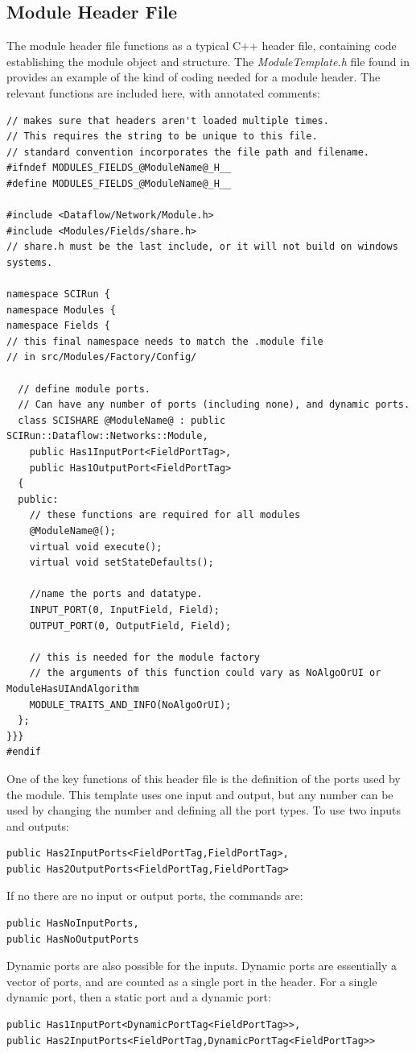 \documentclass[fleqn,11pt,openany]{book}
\begin{document}
\subsection{Module Header File}
\label{sec:header}

The module header file functions as a typical C++ header file, containing code establishing the module object and structure.  
The \emph{ModuleTemplate.h} file found in \emph{} provides an example of the kind of coding needed for a module header.  
The relevant functions are included here, with annotated comments:
\begin{verbatim}
// makes sure that headers aren't loaded multiple times. 
// This requires the string to be unique to this file.
// standard convention incorporates the file path and filename.
#ifndef MODULES_FIELDS_@ModuleName@_H__
#define MODULES_FIELDS_@ModuleName@_H__

#include <Dataflow/Network/Module.h>
#include <Modules/Fields/share.h>
// share.h must be the last include, or it will not build on windows systems.

namespace SCIRun {
namespace Modules {
namespace Fields {
// this final namespace needs to match the .module file
// in src/Modules/Factory/Config/
  
  // define module ports.  
  // Can have any number of ports (including none), and dynamic ports.
  class SCISHARE @ModuleName@ : public SCIRun::Dataflow::Networks::Module,
    public Has1InputPort<FieldPortTag>,
    public Has1OutputPort<FieldPortTag>
  {
  public:
    // these functions are required for all modules
    @ModuleName@();
    virtual void execute();
    virtual void setStateDefaults();
    
    //name the ports and datatype.
    INPUT_PORT(0, InputField, Field);
    OUTPUT_PORT(0, OutputField, Field);
  
    // this is needed for the module factory
    // the arguments of this function could vary as NoAlgoOrUI or ModuleHasUIAndAlgorithm
    MODULE_TRAITS_AND_INFO(NoAlgoOrUI);
  };
}}}
#endif
\end{verbatim}
One of the key functions of this header file is the definition of the ports used by the module.  
This template uses one input and output, but any number can be used by changing the number and defining all the port types.
To use two inputs and outputs:
\begin{verbatim}
public Has2InputPorts<FieldPortTag,FieldPortTag>,
public Has2OutputPorts<FieldPortTag,FieldPortTag>
\end{verbatim}
If no there are no input or output ports, the commands are:
\begin{verbatim}
public HasNoInputPorts,
public HasNoOutputPorts
\end{verbatim}
Dynamic ports are also possible for the inputs.  
Dynamic ports are essentially a vector of ports, and are counted as a single port in the header.
For a single dynamic port, then a static port and a dynamic port:
\begin{verbatim}
public Has1InputPort<DynamicPortTag<FieldPortTag>>,
public Has2InputPorts<FieldPortTag,DynamicPortTag<FieldPortTag>>
\end{verbatim}
\end{document}
